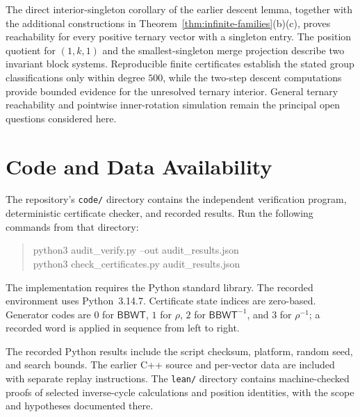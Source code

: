 \documentclass[11pt,a4paper]{article}
\theoremstyle{definition}
\newcommand{\BBWT}{\mathsf{BBWT}}
\begin{document}
The direct interior-singleton corollary of the earlier descent lemma, together with the additional constructions in Theorem~\ref{thm:infinite-families}(b)(c), proves reachability for every positive ternary vector with a singleton entry. The position quotient for $(1,k,1)$ and the smallest-singleton merge projection describe two invariant block systems. Reproducible finite certificates establish the stated group classifications only within degree $500$, while the two-step descent computations provide bounded evidence for the unresolved ternary interior. General ternary reachability and pointwise inner-rotation simulation remain the principal open questions considered here.

\section*{Code and Data Availability}

The repository's \texttt{code/} directory contains the independent verification program, deterministic certificate checker, and recorded results. Run the following commands from that directory:
\begin{quote}\ttfamily\small
python3 audit\_verify.py --out audit\_results.json\\
python3 check\_certificates.py audit\_results.json
\end{quote}
The implementation requires the Python standard library. The recorded environment uses Python~3.14.7. Certificate state indices are zero-based. Generator codes are $0$ for $\BBWT$, $1$ for $\rho$, $2$ for $\BBWT^{-1}$, and $3$ for $\rho^{-1}$; a recorded word is applied in sequence from left to right.

The recorded Python results include the script checksum, platform, random seed, and search bounds. The earlier C++ source and per-vector data are included with separate replay instructions. The \texttt{lean/} directory contains machine-checked proofs of selected inverse-cycle calculations and position identities, with the scope and hypotheses documented there.




\end{document}
